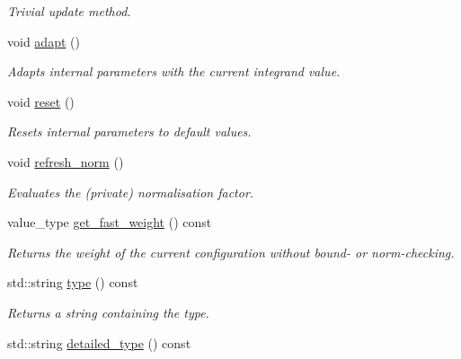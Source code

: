 \begin{DoxyCompactItemize}
\begin{DoxyCompactList}\small\item\em Trivial update method. \end{DoxyCompactList}\item 
\hypertarget{a00001_a210613616821fb9433ee3cebaf4f5ef7}{}void \hyperlink{a00001_a210613616821fb9433ee3cebaf4f5ef7}{adapt} ()\label{a00001_a210613616821fb9433ee3cebaf4f5ef7}

\begin{DoxyCompactList}\small\item\em Adapts internal parameters with the current integrand value. \end{DoxyCompactList}\item 
\hypertarget{a00001_abfdfdd22b18f9d68e0e1c9b53eac57e5}{}void \hyperlink{a00001_abfdfdd22b18f9d68e0e1c9b53eac57e5}{reset} ()\label{a00001_abfdfdd22b18f9d68e0e1c9b53eac57e5}

\begin{DoxyCompactList}\small\item\em Resets internal parameters to default values. \end{DoxyCompactList}\item 
\hypertarget{a00001_a905a3a132c6057621cfc1fd65f3cf7f6}{}void \hyperlink{a00001_a905a3a132c6057621cfc1fd65f3cf7f6}{refresh\+\_\+norm} ()\label{a00001_a905a3a132c6057621cfc1fd65f3cf7f6}

\begin{DoxyCompactList}\small\item\em Evaluates the (private) normalisation factor. \end{DoxyCompactList}\item 
value\+\_\+type \hyperlink{a00001_aac9de7a843e6d91ed6cda6758f2e19e4}{get\+\_\+fast\+\_\+weight} () const 
\begin{DoxyCompactList}\small\item\em Returns the weight of the current configuration without bound-\/ or norm-\/checking. \end{DoxyCompactList}\item 
\hypertarget{a00001_a629c8ce8869fca16034d0e6826795247}{}std\+::string \hyperlink{a00001_a629c8ce8869fca16034d0e6826795247}{type} () const \label{a00001_a629c8ce8869fca16034d0e6826795247}

\begin{DoxyCompactList}\small\item\em Returns a string containing the type. \end{DoxyCompactList}\item 
\hypertarget{a00001_a7ec4feef650ac1cc70d9a36c1f611be3}{}std\+::string \hyperlink{a00001_a7ec4feef650ac1cc70d9a36c1f611be3}{detailed\+\_\+type} () const \label{a00001_a7ec4feef650ac1cc70d9a36c1f611be3}


\end{DoxyCompactItemize}
